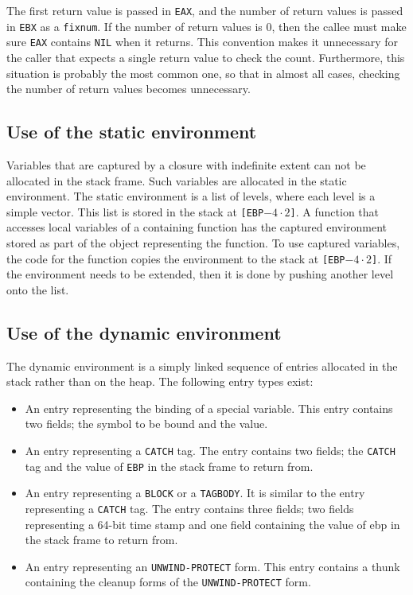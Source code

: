 The first return value is passed in \texttt{EAX}, and the number of
return values is passed in \texttt{EBX} as a \texttt{fixnum}.  If the
number of return values is $0$, then the callee must make sure
\texttt{EAX} contains \texttt{NIL} when it returns.  This convention
makes it unnecessary for the caller that expects a single return value
to check the count.  Furthermore, this situation is probably the most
common one, so that in almost all cases, checking the number of return
values becomes unnecessary.

\subsection{Use of the static environment}
\label{backends-x86-32-static-environment}

Variables that are captured by a closure with indefinite extent can
not be allocated in the stack frame.  Such variables are allocated in
the static environment.  The static environment is a list of levels,
where each level is a simple vector.  This list is stored in the stack
at \texttt{[EBP$-4 \cdot 2$]}.  A function that accesses local
variables of a containing function has the captured environment stored
as part of the object representing the function.  To use captured
variables, the code for the function copies the environment to the
stack at \texttt{[EBP$-4 \cdot 2$]}.  If the environment needs to be
extended, then it is done by pushing another level onto the list.

\subsection{Use of the dynamic environment}

The dynamic environment is a simply linked sequence of entries
allocated in the stack rather than on the heap.  The following entry
types exist:

\begin{itemize}
  \item An entry representing the binding of a special variable.  This
    entry contains two fields; the symbol to be bound and the value.

  \item An entry representing a \texttt{CATCH} tag.  The entry
    contains two fields; the \texttt{CATCH} tag and the value of
    \texttt{EBP} in the stack frame to return from.

  \item An entry representing a \texttt{BLOCK} or a \texttt{TAGBODY}.
    It is similar to the entry representing a \texttt{CATCH} tag.  The
    entry contains three fields; two fields representing a 64-bit time
    stamp and one field containing the value of ebp in the stack frame
    to return from.

  \item An entry representing an \texttt{UNWIND-PROTECT} form.  This
    entry contains a thunk containing the cleanup forms of the
    \texttt{UNWIND-PROTECT} form.
\end{itemize}

